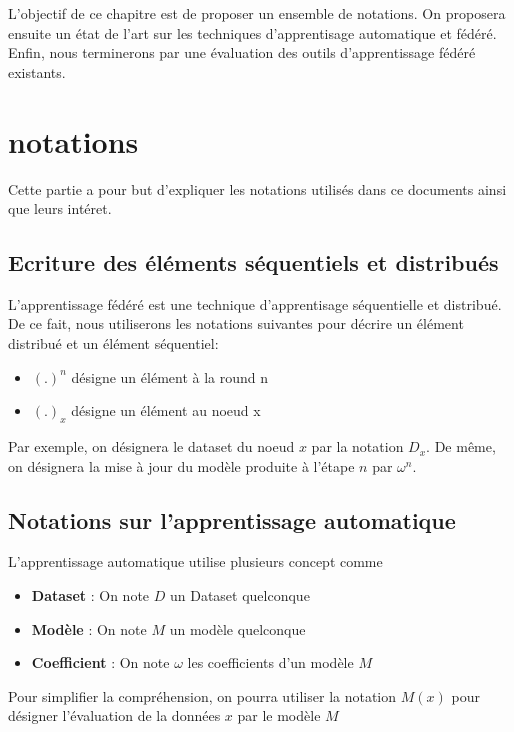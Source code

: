 \documentclass[stage3a]{tnreport} %
\begin{document}
L'objectif de ce chapitre est de proposer un ensemble de notations. On proposera ensuite un état de l'art sur les techniques d'apprentisage automatique et fédéré. Enfin, nous terminerons par une évaluation des outils d'apprentissage fédéré existants.

\section{notations}

Cette partie a pour but d'expliquer les notations utilisés dans ce documents ainsi que leurs intéret.

\subsection{Ecriture des éléments séquentiels et distribués}

L'apprentissage fédéré est une technique d'apprentisage séquentielle et distribué. De ce fait, nous utiliserons les notations suivantes pour décrire un élément distribué et un élément séquentiel:

\begin{itemize}
  \item \textbf{$(.)^n$} désigne un élément à la round n
  \item \textbf{$(.)_x$} désigne un élément au noeud x
\end{itemize}

Par exemple, on désignera le dataset du noeud $x$ par la notation $D_x$. De même, on désignera la mise à jour du modèle produite à l'étape $n$ par 
$\omega^n$.

\subsection{Notations sur l'apprentissage automatique}

L'apprentissage automatique utilise plusieurs concept comme 

\begin{itemize}
  \item \textbf{Dataset} : On note $D$ un Dataset quelconque
  \item \textbf{Modèle} : On note $M$ un modèle quelconque
  \item \textbf{Coefficient} : On note $\omega$ les coefficients d'un modèle $M$
\end{itemize}

Pour simplifier la compréhension, on pourra utiliser la notation $M(x)$ pour désigner l'évaluation de la données $x$
par le modèle $M$
\end{document}
